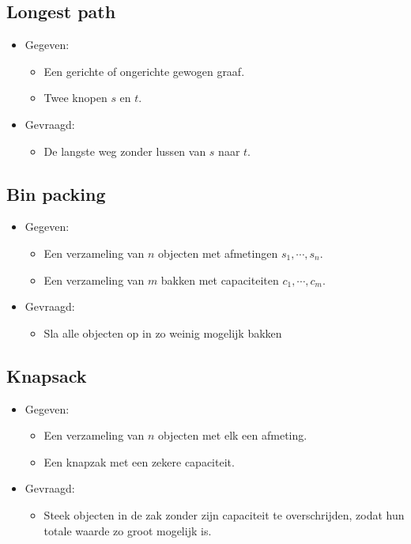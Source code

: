 \subsection{Longest path}
\begin{itemize}
    \item Gegeven:
    \begin{itemize}
        \item Een gerichte of ongerichte gewogen graaf.
        \item Twee knopen $s$ en $t$.
    \end{itemize}
    \item Gevraagd:
    \begin{itemize}
        \item De langste weg zonder lussen van $s$ naar $t$.
    \end{itemize}
\end{itemize}

\subsection{Bin packing}
\begin{itemize}
    \item Gegeven:
    \begin{itemize}
        \item Een verzameling van $n$ objecten met afmetingen $s_1, \cdots, s_n$.
        \item Een verzameling van $m$ bakken met capaciteiten $c_1, \cdots, c_m$.
    \end{itemize}
    \item Gevraagd:
    \begin{itemize}
        \item Sla alle objecten op in zo weinig mogelijk bakken 
    \end{itemize}
\end{itemize}

\subsection{Knapsack}
\begin{itemize}
    \item Gegeven:
    \begin{itemize}
        \item Een verzameling van $n$ objecten met elk een afmeting.
        \item Een knapzak met een zekere capaciteit.
    \end{itemize}
    \item Gevraagd:
    \begin{itemize}
        \item Steek objecten in de zak zonder zijn capaciteit te overschrijden, zodat hun totale waarde zo groot mogelijk is.
    \end{itemize}
\end{itemize}